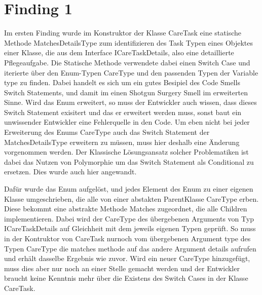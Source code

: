 \section{Finding 1}
Im ersten Finding wurde im Konstruktor der Klasse CareTask eine statische Methode MatchesDetailsType zum identifizieren des Task Typen eines Objektes einer Klasse, die aus dem Interface ICareTaskDetails, also eine detaillierte Pflegeaufgabe. Die Statische Methode verwendete dabei einen Switch Case und iterierte über den Enum-Typen CareType und den passenden Typen der Variable type zu finden. Dabei handelt es sich um ein gutes Besipiel des Code Smells Switch Statements, und damit im einen Shotgun Surgery Smell im erweiterten Sinne. Wird das Enum erweitert, so muss der Entwickler auch wissen, dass dieses Switch Statement exisitert und das er erweitert werden muss, sonst baut ein unwissender Entwickler eine Fehlerquelle in den Code. Um eben nicht bei jeder Erweiterung des Enums CareType auch das Switch Statement der MatchesDetailsType erweitern zu müssen, muss hier deshalb eine Änderung vorgenommen werden.  Der Klassische Lösungsansatz solcher Problematiken ist dabei das Nutzen von Polymorphie um das Switch Statement als Conditional zu ersetzen. Dies wurde auch hier angewandt. 
\par
Dafür wurde das Enum aufgelöst, und jedes Element des Enum zu einer eigenen Klasse umgeschrieben, die alle von einer abstakten ParentKlasse CareType erben. Diese bekommt eine abstrakte Methode Matches zugeordnet, die alle Children implementieren. Dabei wird der CareType des übergebenen Arguments von Typ ICareTaskDetails auf Gleichheit mit dem jeweils eigenen Typen geprüft. So muss in der Kontruktor von CareTask nurnoch vom übergebenen Argument type des Typen CareType die matches methode auf das andere Argument details aufrufen und erhält dasselbe Ergebnis wie zuvor. Wird ein neuer CareType hinzugefügt, muss dies aber nur noch an einer Stelle gemacht werden und der Entwickler braucht keine Kenntnis mehr über die Existens des Switch Cases in der Klasse CareTask.
